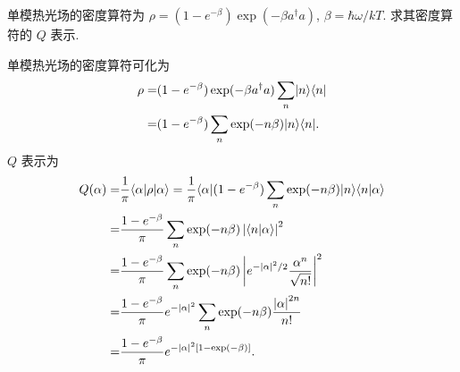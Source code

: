 \documentclass{assignment}
\begin{document}
\begin{prob}
    单模热光场的密度算符为 $\rho=(1-e^{-\beta})\exp(-\beta a^{\dagger}a)$, $\beta=\hbar\omega/kT$. 求其密度算符的 $Q$ 表示.
\end{prob}
\begin{sol}
    单模热光场的密度算符可化为
    \begin{align}
        \notag\rho=&(1-e^{-\beta})\exp(-\beta a^{\dagger}a)\sum_n\lvert n\rangle\langle n\rvert\\
        \notag=&(1-e^{-\beta})\sum_n\exp(-n\beta)\lvert n\rangle\langle n\rvert.
    \end{align}
    $Q$ 表示为
    \begin{align}
        \notag Q(\alpha)=&\frac{1}{\pi}\langle\alpha\rvert\rho\lvert\alpha\rangle=\frac{1}{\pi}\langle\alpha\rvert(1-e^{-\beta})\sum_n\exp(-n\beta)\lvert n\rangle\langle n\vert\alpha\rangle\\
        \notag=&\frac{1-e^{-\beta}}{\pi}\sum_n\exp(-n\beta)\left\lvert\langle n\vert\alpha\rangle\right\rvert^2\\
        \notag=&\frac{1-e^{-\beta}}{\pi}\sum_n\exp(-n\beta)\left\lvert e^{-\left\lvert\alpha\right\rvert^2/2}\frac{\alpha^n}{\sqrt{n!}}\right\rvert^2\\
        \notag=&\frac{1-e^{-\beta}}{\pi}e^{-\left\lvert\alpha\right\rvert^2}\sum_n\exp(-n\beta)\frac{\left\lvert\alpha\right\rvert^{2n}}{n!}\\
        =&\frac{1-e^{-\beta}}{\pi}e^{-\left\lvert\alpha\right\rvert^2[1-\exp(-\beta)]}.
    \end{align}
\end{sol}
\end{document}
